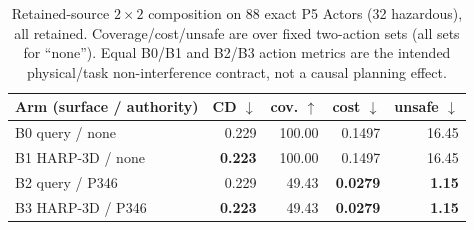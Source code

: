 \begin{table}[t]
  \centering
  \caption{Retained-source $2\times2$ composition on 88 exact P5 Actors (32 hazardous), all retained. Coverage/cost/unsafe
  are over fixed two-action sets (all sets for ``none''). Equal B0/B1 and B2/B3 action metrics are the intended
  physical/task non-interference contract, not a causal planning effect.}
  \label{tab:p9-composed}
  \scriptsize
  \setlength{\tabcolsep}{2.4pt}
  \begin{tabular}{lrrrr}
    \toprule
    Arm (surface / authority) & CD $\downarrow$ & cov. $\uparrow$ & cost $\downarrow$ & unsafe $\downarrow$ \\
    \midrule
    B0 query / none & 0.229 & 100.00 & 0.1497 & 16.45 \\
    B1 HARP-3D / none & \textbf{0.223} & 100.00 & 0.1497 & 16.45 \\
    B2 query / P346 & 0.229 & 49.43 & \textbf{0.0279} & \textbf{1.15} \\
    B3 HARP-3D / P346 & \textbf{0.223} & 49.43 & \textbf{0.0279} & \textbf{1.15} \\
    \bottomrule
  \end{tabular}
\end{table}
